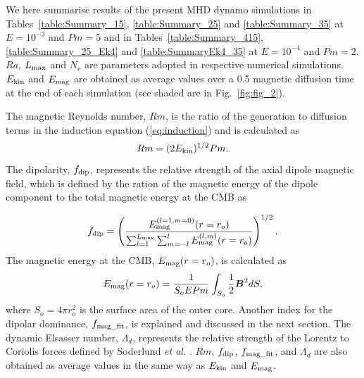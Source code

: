 {\color{red}
We here summarise results of the present MHD dynamo simulations in Tables~\ref{table:Summary_15}, \ref{table:Summary_25} and \ref{table:Summary_35} at $E = 10^{-3}$ and $Pm = 5$ and in  Tables~\ref{table:Summary_415}, \ref{table:Summary_25_Ek4} and \ref{table:SummaryEk4_35} at $E = 10^{-4}$ and $Pm = 2$.
}
{\color{red}
$Ra$, $L_{\rm max}$ and $N_r$ are parameters adopted in respective numerical simulations.
$E_{\rm kin}$ and $E_{\rm mag}$ are obtained as average values over a 0.5 magnetic diffusion time at the end of each simulation (see shaded are in Fig.~\ref{fig:fig_2}).
}
{\color{red}
The magnetic Reynolds number, $Rm$, is the ratio of the generation to diffusion terms in the induction equation (\ref{eq:induction}) and is calculated as
%
\begin{equation}
Rm = (2 E_{\rm kin})^{1/2} Pm .
\label{eq:Rm}
\end{equation}
%
The dipolarity, $f_{\rm dip}$, represents the relative strength of the axial dipole magnetic field, which is defined by the ration of the magnetic energy of the dipole component to the total magnetic energy at the CMB as
%

%
\begin{equation}
f_{\rm dip} = 
\left(
\frac{E_{\rm mag}^{(l=1,m=0)} (r=r_o)}
     {\sum_{l=1}^{L_{\rm max}}
      \sum_{m=-l}^l E_{\rm mag}^{(l,m)} (r=r_o)}
\right)^{1/2}.
\label{eq:f_dip}
\end{equation}
%
The magnetic energy at the CMB, $E_{\rm mag} (r=r_o)$, is calculated as
%
\begin{equation}
E_{\rm mag} (r=r_o) = 
  \frac{1}{S_o E Pm} \int_{S_o} \frac{1}{2} \mbox{\boldmath$B$}^2 dS,
\end{equation}
%
where $S_o = 4\pi r_o^2$ is the surface area of the outer core.
Another index for the dipolar dominance, $f_{\rm mag\_fit}$, is explained and discussed in the next section.
The dynamic Elsasser number, $\Lambda_d$, represents the relative strength of the Lorentz to Coriolis forces defined by Soderlund {\it et al.} .
$Rm$, $f_{\rm dip}$, $f_{\rm mag\_fit}$, and $\Lambda_d$ are also obtained as average values in the same way as $E_{\rm kin}$ and $E_{\rm mag}$.
}

